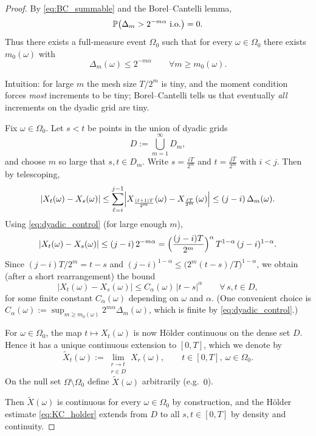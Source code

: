 \begin{proof}[Proof]
\medskip
\noindent{}
By \eqref{eq:BC_summable} and the Borel--Cantelli lemma,
\[
\mathbb{P}\bigl(\Delta_m > 2^{-m\alpha}\ \text{i.o.}\bigr)=0.
\]
Thus there exists a full-measure event $\Omega_0$ such that for every $\omega\in\Omega_0$
there exists $m_0(\omega)$ with
\begin{equation}\label{eq:dyadic_control}
\Delta_m(\omega)\le 2^{-m\alpha}\qquad\forall m\ge m_0(\omega).
\end{equation}

Intuition: for large $m$ the mesh size $T/2^m$ is tiny, and the moment condition forces
\emph{most} increments to be tiny; Borel--Cantelli tells us that eventually
\emph{all} increments on the dyadic grid are tiny.

\medskip
\noindent{}
Fix $\omega\in\Omega_0$.
Let $s<t$ be points in the union of dyadic grids
\[
D:=\bigcup_{m=1}^\infty D_m,
\]
and choose $m$ so large that $s,t\in D_m$.
Write $s=\frac{iT}{2^m}$ and $t=\frac{jT}{2^m}$ with $i<j$.
Then by telescoping,
\[
|X_t(\omega)-X_s(\omega)|
\le \sum_{\ell=i}^{j-1}\Bigl|X_{\frac{(\ell+1)T}{2^m}}(\omega)-X_{\frac{\ell T}{2^m}}(\omega)\Bigr|
\le (j-i)\,\Delta_m(\omega).
\]
Using \eqref{eq:dyadic_control} (for large enough $m$),
\[
|X_t(\omega)-X_s(\omega)|
\le (j-i)\,2^{-m\alpha}
= \Bigl(\frac{(j-i)T}{2^m}\Bigr)^\alpha \,T^{1-\alpha}\,(j-i)^{1-\alpha}.
\]
Since $(j-i)T/2^m = t-s$ and $(j-i)^{1-\alpha}\le \bigl(2^m(t-s)/T\bigr)^{1-\alpha}$, we obtain
(after a short rearrangement) the bound
\[
|X_t(\omega)-X_s(\omega)|
\le C_\alpha(\omega)\,|t-s|^\alpha
\qquad\forall\, s,t\in D,
\]
for some finite constant $C_\alpha(\omega)$ depending on $\omega$ and $\alpha$.
(One convenient choice is
$C_\alpha(\omega):=\sup_{m\ge m_0(\omega)} 2^{m\alpha}\Delta_m(\omega)$, which is finite by
\eqref{eq:dyadic_control}.)

\medskip
\noindent{}
For $\omega\in\Omega_0$, the map $t\mapsto X_t(\omega)$ is now H\"older continuous on the dense set $D$.
Hence it has a unique continuous extension to $[0,T]$, which we denote by
\[
\widetilde X_t(\omega):=\lim_{\substack{r\to t\\ r\in D}} X_r(\omega),
\qquad t\in[0,T],\ \omega\in\Omega_0.
\]
On the null set $\Omega\setminus\Omega_0$ define $\widetilde X(\omega)$ arbitrarily (e.g.\ $0$).

Then $\widetilde X(\omega)$ is continuous for every $\omega\in\Omega_0$ by construction,
and the H\"older estimate \eqref{eq:KC_holder} extends from $D$ to all $s,t\in[0,T]$
by density and continuity.


\end{proof}
